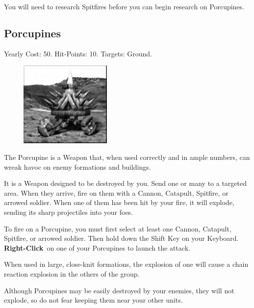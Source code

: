 You will need to research Spitfires before you can begin research on Porcupines.

\clearpage

\subsection{Porcupines}


\begin{center}
Yearly Cost: 50. Hit-Points: 10. Targets: Ground.
\end{center}

\begin{figure}
	\vspace{-20pt}
	\begin{center}
		\includegraphics[width=0.4\textwidth]{Aporcupine}
	\end{center}
	\vspace{-20pt}
\end{figure}

The Porcupine is a Weapon that, when used correctly and in ample numbers, can wreak havoc on enemy formations and buildings.

It is a Weapon designed to be destroyed by you. Send one or many to a targeted area. When they arrive, fire on them with a Cannon, Catapult, Spitfire, or arrowed soldier. When one of them has been hit by your fire, it will explode, sending its sharp projectiles into your foes.

To fire on a Porcupine, you must first select at least one Cannon, Catapult, Spitfire, or arrowed soldier. Then hold down the Shift Key on your Keyboard. \textbf{Right-Click} on one of your Porcupines to launch the attack.

When used in large, close-knit formations, the explosion of one will cause a chain reaction explosion in the others of the group.

Although Porcupines may be easily destroyed by your enemies, they will not explode, so do not fear keeping them near your other units.

